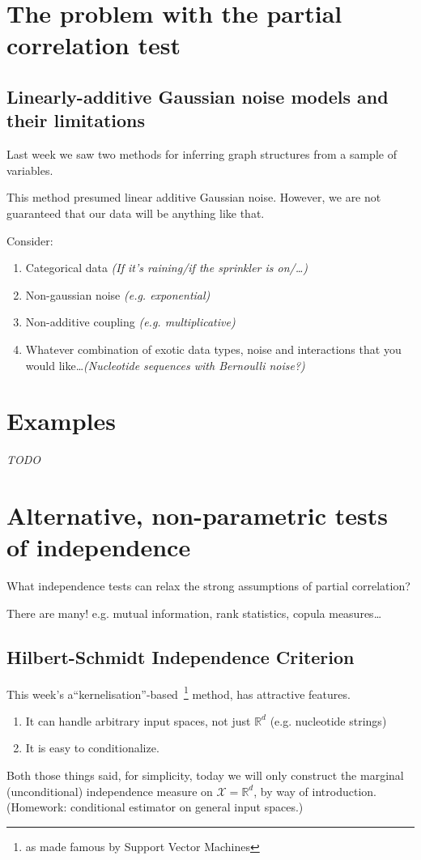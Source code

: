 \section{The problem with the partial correlation test}

\subsection{Linearly-additive Gaussian noise models and their limitations}
Last week we saw two methods for inferring graph structures from a sample of variables.

This method presumed linear additive Gaussian noise. However, we are not guaranteed that our data will be anything like that.

\clearpage
Consider:
\begin{enumerate}
\item Categorical data \emph{(If it's raining/if the sprinkler is on/\ldots)}
\item Non-gaussian noise \emph{(e.g. exponential)}
\item Non-additive coupling \emph{(e.g. multiplicative)}
\item Whatever combination of exotic data types, noise and interactions that you would like\dots \emph{(Nucleotide sequences with Bernoulli noise?)}
\end{enumerate}
\clearpage
\section{Examples}
\emph{TODO}
\clearpage
\section{Alternative, non-parametric tests of independence}
What independence tests can relax the strong assumptions of partial correlation?

There are many! e.g. mutual information, rank statistics, copula measures\ldots
\clearpage
\subsection{Hilbert-Schmidt Independence Criterion}
This week's a``kernelisation''-based~\footnote{as made famous by Support Vector Machines} method, has attractive features.
\begin{enumerate}
\item It can handle arbitrary input spaces, not just $\mathbb{R}^d$ (e.g. nucleotide strings)
\item It is easy to conditionalize.
\end{enumerate}
Both those things said, for simplicity, today we will only construct the marginal (unconditional) independence measure on $\mathcal{X}=\mathbb{R}^d$, by way of introduction. (Homework: conditional estimator on general input spaces.)
\clearpage
